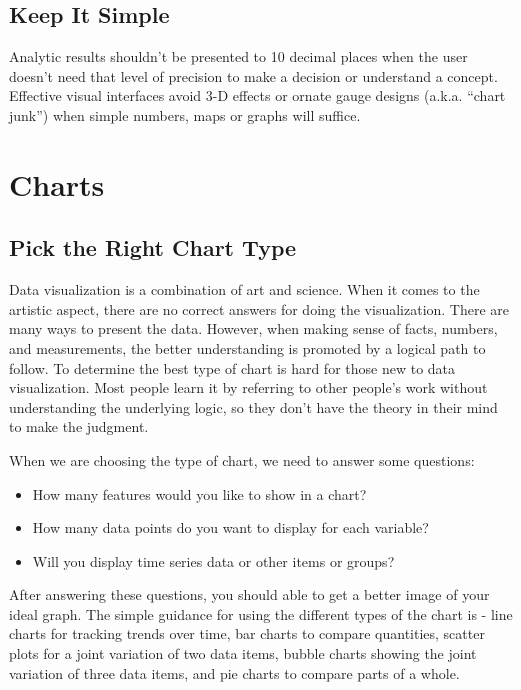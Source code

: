 \documentclass[]{book}
\providecommand{\tightlist}{%
  \setlength{\itemsep}{0pt}\setlength{\parskip}{0pt}}
\theoremstyle{definition}
\theoremstyle{definition}
\theoremstyle{definition}
\theoremstyle{remark}
\begin{document}
\subsection{Keep It Simple}\label{keep-it-simple}

Analytic results shouldn't be presented to 10 decimal places when the
user doesn't need that level of precision to make a decision or
understand a concept. Effective visual interfaces avoid 3-D effects or
ornate gauge designs (a.k.a. ``chart junk'') when simple numbers, maps
or graphs will suffice.

\section{Charts}\label{charts}

\subsection{Pick the Right Chart Type}\label{pick-the-right-chart-type}

Data visualization is a combination of art and science. When it comes to
the artistic aspect, there are no correct answers for doing the
visualization. There are many ways to present the data. However, when
making sense of facts, numbers, and measurements, the better
understanding is promoted by a logical path to follow. To determine the
best type of chart is hard for those new to data visualization. Most
people learn it by referring to other people's work without
understanding the underlying logic, so they don't have the theory in
their mind to make the judgment.

When we are choosing the type of chart, we need to answer some
questions:

\begin{itemize}
\tightlist
\item
  How many features would you like to show in a chart?
\item
  How many data points do you want to display for each variable?
\item
  Will you display time series data or other items or groups?
\end{itemize}

After answering these questions, you should able to get a better image
of your ideal graph. The simple guidance for using the different types
of the chart is - line charts for tracking trends over time, bar charts
to compare quantities, scatter plots for a joint variation of two data
items, bubble charts showing the joint variation of three data items,
and pie charts to compare parts of a whole.
\end{document}
